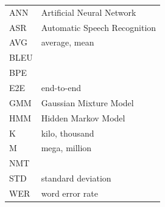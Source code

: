 \documentclass[12pt,a4paper]{report}
\begin{document}

\renewcommand{\bibname}{Bibliography}





%
%


\listoffigures

\listoftables

    \begin{tabular}{ll}
    	ANN & Artificial Neural Network \\
        ASR & Automatic Speech Recognition \\
        AVG & average, mean\\
        BLEU & \\
        BPE & \\
        E2E & end-to-end \\
        GMM & Gaussian Mixture Model \\
        HMM & Hidden Markov Model \\
        K & kilo, thousand \\
        M & mega, million \\
        NMT & \\
        STD & standard deviation \\
        WER & word error rate \\
        
    \end{tabular}
\end{document}
